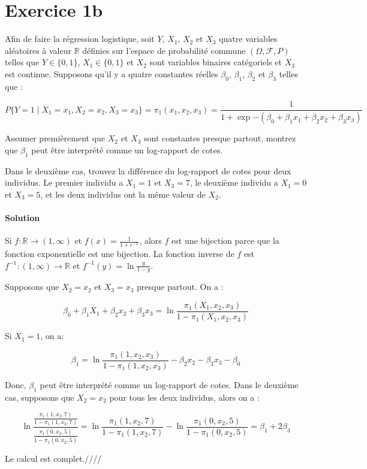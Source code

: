 \documentclass[../main.tex]{subfiles}
\begin{document}
\section*{Exercice 1b}
\begin{CJK*}{UTF8}{gbsn}
Afin de faire la régression logistique, soit $Y$, $X_1$, $X_2$ et $X_3$ quatre 
variables aléatoires à valeur $\mathbb{R}$ définies sur 
l'espace de probabilité commune $(\Omega, \mathcal{F}, P)$ telles que 
$Y \in \{0,1\}$, $X_1 \in \{0,1\}$ et $X_2$ sont variables binaires catégoriels et $X_3$ est continue.
Supposons qu'il y a quatre constantes réelles $\beta_0$, $\beta_1$, $\beta_2$ et $\beta_3$ telles que :

\begin{equation*}
    P \{Y = 1 \mid X_1 = x_1, X_2 = x_2, X_3 = x_3 \} = \pi_1(x_1,x_2,x_3) = \frac{1}{1 + \exp{-(\beta_0 + \beta_1 x_1 + \beta_2 x_2 + \beta_3 x_3)}}
\end{equation*}

Assumer premièrement que $X_2$ et $X_3$ sont constantes presque partout, montrez que $\beta_1$ peut 
être interprété comme un log-rapport de cotes. 

Dans le deuxième cas, trouvez la différence du log-rapport de cotes pour deux individus.
Le premier individu a $X_1=1$ et $X_3 = 7$, le deuxième individu a $X_1=0$ et $X_3 = 5$, et les deux 
individus ont la même valeur de $X_2$.

\smallskip
\paragraph{Solution}
Si $f: \mathbb{R} \to (1, \infty)$ et $f(x) = \frac{1}{1+e^{-x}}$, alors $f$ est une bijection parce que la fonction exponentielle est une bijection.
La fonction inverse de $f$ est $f^{-1}: (1, \infty) \to \mathbb{R}$ et $f^{-1}(y) = \ln{\frac{y}{1-y}}$.

Supposons que $X_2 = x_2$ et $X_3 = x_3$ presque partout. On a :

\begin{equation*}
    \beta_0 + \beta_1 X_1 + \beta_2 x_2 + \beta_3 x_3 = \ln{\frac{ \pi_1(X_1,x_2,x_3)}{1-\pi_1(X_1,x_2,x_3)}}
\end{equation*}

Si $X_1 = 1$, on a:

\begin{equation*}
    \beta_1= \ln{\frac{ \pi_1(1,x_2,x_3)}{1-\pi_1(1,x_2,x_3)}} - \beta_2 x_2 - \beta_3 x_3 - \beta_0
\end{equation*}

Donc, $\beta_1$ peut être interprété comme un log-rapport de cotes.
Dans le deuxième cas, supposons que $X_2 = x_2$ pour tous les deux individus, alors on a :

\begin{equation*}
    \ln \frac{ \frac{\pi_1(1,x_2,7)}{1-\pi_1(1,x_2,7)}}{ \frac{\pi_1(0,x_2,5)}{1-\pi_1(0,x_2,5)}} =  
    \ln \frac{\pi_1(1,x_2,7)}{1-\pi_1(1,x_2,7)} - \ln \frac{\pi_1(0,x_2,5)}{1-\pi_1(0,x_2,5)} =  \beta_1 + 2\beta_3
\end{equation*}

Le calcul est complet.////
\end{CJK*}
\end{document}
